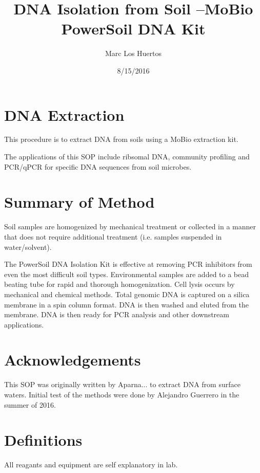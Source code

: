 \documentclass[12pt]{../SOP3_alpha}
\title{DNA Isolation from Soil --MoBio PowerSoil DNA Kit}
\date{8/15/2016}
\author{Marc Los Huertos}
\begin{document}


\maketitle

\section{DNA Extraction }

\NP This procedure is to extract DNA from soils using a MoBio extraction kit. 

\NP The applications of this SOP include ribsomal DNA, community profiling and PCR/qPCR for specific DNA sequences from soil microbes. 

\section{Summary of Method}

Soil samples are homogenized by mechanical treatment or collected in a manner that does not require additional treatment (i.e. samples suspended in water/solvent). 

The PowerSoil\textsuperscript{\textregistered} DNA Isolation Kit is effective at removing PCR inhibitors from even
the most difficult soil types. Environmental samples are added to a bead beating
tube for rapid and thorough homogenization. Cell lysis occurs by mechanical and
chemical methods. Total genomic DNA is captured on a silica membrane in a spin
column format. DNA is then washed and eluted from the membrane. DNA is then
ready for PCR analysis and other downstream applications. 

\tableofcontents

\newpage

\section{Acknowledgements}

\NP This SOP was originally written by Aparna... to extract DNA from surface waters. Initial test of the methods were done by Alejandro Guerrero in the summer of 2016. 

\section{Definitions}

\NP All reagants and equipment are self explanatory in lab. 
\end{document}
